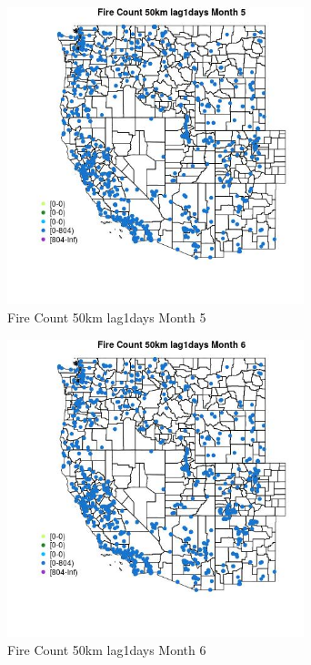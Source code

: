 \begin{figure} 
\centering  
\includegraphics[width=0.77\textwidth]{Code_Outputs/Report_ML_input_PM25_Step4_part_f_de_duplicated_aves_prioritize_24hr_obswNAs_MapObsMo5Fire_Count_50km_lag1days.jpg} 
\caption{\label{fig:Report_ML_input_PM25_Step4_part_f_de_duplicated_aves_prioritize_24hr_obswNAsMapObsMo5Fire_Count_50km_lag1days}Fire Count 50km lag1days Month 5} 
\end{figure} 
 

\begin{figure} 
\centering  
\includegraphics[width=0.77\textwidth]{Code_Outputs/Report_ML_input_PM25_Step4_part_f_de_duplicated_aves_prioritize_24hr_obswNAs_MapObsMo6Fire_Count_50km_lag1days.jpg} 
\caption{\label{fig:Report_ML_input_PM25_Step4_part_f_de_duplicated_aves_prioritize_24hr_obswNAsMapObsMo6Fire_Count_50km_lag1days}Fire Count 50km lag1days Month 6} 
\end{figure} 
 

